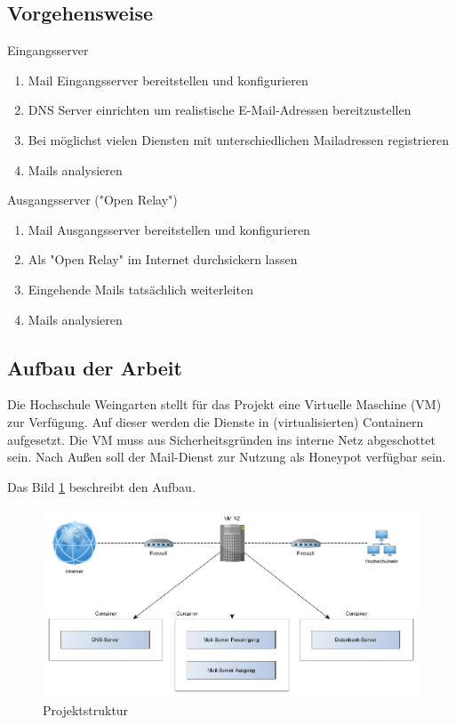 \documentclass[a4paper,11pt,singlespacing]{article}
\begin{document}
	\subsection{Vorgehensweise}\label{sec:EinleitungVorgehensweise}
		Eingangsserver
		\begin{enumerate}
		\item Mail Eingangsserver bereitstellen und konfigurieren
		\item DNS Server einrichten um realistische E-Mail-Adressen bereitzustellen
		\item Bei möglichst vielen Diensten mit unterschiedlichen Mailadressen registrieren
		\item Mails analysieren
		\end{enumerate}

		Ausgangsserver ("Open Relay") %
		\begin{enumerate}
		\item Mail Ausgangsserver bereitstellen und konfigurieren
		\item Als "Open Relay" im Internet durchsickern lassen %
		\item Eingehende Mails tatsächlich weiterleiten
		\item Mails analysieren
		\end{enumerate}

	\subsection{Aufbau der Arbeit}\label{sec:EinleitungAufbau}
		Die Hochschule Weingarten stellt für das Projekt eine Virtuelle Maschine (VM) zur Verfügung. %
		Auf dieser werden die Dienste in (virtualisierten) Containern aufgesetzt. %
		Die VM muss aus Sicherheitsgründen ins interne Netz abgeschottet sein.
		Nach Außen soll der Mail-Dienst zur Nutzung als Honeypot verfügbar sein.

		Das Bild \ref{fig:structure} beschreibt den Aufbau.

		\begin{figure}
		\includegraphics[width=\linewidth]{2-Hierarchy.png}
		\caption{Projektstruktur}
		\label{fig:structure}
		\end{figure}
\end{document}
